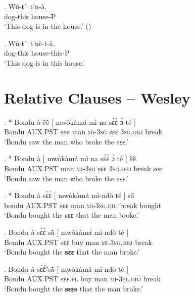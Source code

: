 \documentclass{assets/fieldnotes}
\begin{document}
\exg. W\'{u}-t\`{} t\'{}n-\`{a}. \\
dog-this house-P \\
`This dog is in the house.' ()

\exg. W\'{u}-t\`{} t\'{}n\`{e}-t-\`{a}. \\
dog-this house-this-P \\
`This dog is in this house.' 



\section{Relative Clauses -- Wesley}


\exg. * Bondu à ẽ̀ẽ̀ {[} mwòkàmá mì-na sɛ̀ɛ̀ ɔ̀ té {]}\\
Bondu \textsc{AUX.PST} see {} man \textsc{mi}-\textsc{3sg} sɛɛ \textsc{3sg.obj} break {}\\
`Bondu saw the man who broke the sɛɛ.’

\exg. * Bondu à {[} mwòkàmá mì na sɛ̀ɛ̀ ɔ̀ té {]} ẽ̀ẽ̀ \\
Bondu \textsc{AUX.PST} {} man \textsc{mi}-\textsc{3sg} sɛɛ \textsc{3sg.obj} break {} see \\
`Bondu saw the man who broke the sɛɛ.’\\

\exg. * Bondu à sɛ̀ɛ̀ {[} mwòkàmá mì-ndò té {]} sã́\\
bondu \textsc{AUX.PST} sɛɛ {} man \textsc{mi}-\textsc{3sg.obj} break {} bought\\
`Bondu bought the sɛɛ that the man broke.'

\exg. Bondu à sɛ̀ɛ̀ sã́ {[} mwòkàmá mì-ndò té {]}\\
Bondu \textsc{AUX.PST} sɛɛ buy {} man \textsc{mi}-\textsc{3sg.obj} break {}\\
`Bondu bought the \textbf{sɛɛ} that the man broke.'

\exg. Bondu à sɛ̃̀ɛ̃́ sã́ {[} mwòkàmá mî-ndò té {]} \\
Bondu \textsc{AUX.PST} sɛɛ.\textsc{pl} buy {} man \textsc{mi}-\textsc{3pl.obj} break {}\\
`Bondu bought the \textbf{sɛɛs} that the man broke.'
\end{document}
